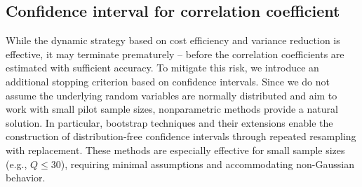 \subsection{Confidence interval for correlation coefficient}
While the dynamic strategy based on cost efficiency and variance reduction is effective, it may terminate prematurely -- before the correlation coefficients are estimated with sufficient accuracy. To mitigate this risk, we introduce an additional stopping criterion based on confidence intervals. Since we do not assume the underlying random variables are normally distributed and aim to work with small pilot sample sizes, nonparametric methods provide a natural solution. In particular, bootstrap techniques \cite{Ef:1979, EfTi:1993} and their extensions \cite{BeDeToMeBaRo:2007} enable the construction of distribution-free confidence intervals through repeated resampling with replacement. These methods are especially effective for small sample sizes (e.g., $Q \leq 30$), requiring minimal assumptions and accommodating non-Gaussian behavior.

